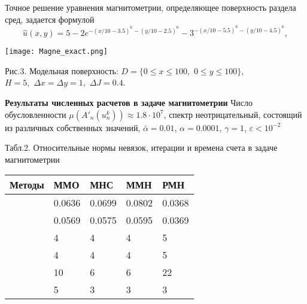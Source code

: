 \documentclass[10pt,pdf, mathserif, hyperref={unicode}]{beamer}
\begin{document}
\begin{frame}
	Точное решение уравнения магнитометрии, определяющее поверхность раздела сред, задается формулой %
	\begin{equation*}
	\hat{u}(x,y)=5-2e^{-(x/10-3.5)^6-(y/10-2.5)^6}-3^{-(x/10-5.5)^6-(y/10-4.5)^6},
	\end{equation*}
	\begin{center}
		\texttt{[image: Magne\_exact.png]}            %
	\end{center}
	
	\begin{center}
		Рис.3. Модельная поверхность: $D=\{0\le x\le 100, \,\,0\le y\le 100\}$, \\ $  H=5,\,\,\Delta x=\Delta y=1,\,\,\Delta J=0.4$.
	\end{center}
\end{frame}
\begin{frame}{\small\textbf{Результаты численных расчетов в задаче магнитометрии}}
	Число обусловленности $\mu(A'_n(u_n^k))\approx 1.8\cdot 10^7$, спектр неотрицательный, состоящий из различных собственных значений, $\bar\alpha=0.01$, $\alpha = 0.0001$, $\gamma=1$, $\varepsilon < 10^{-2}$
	
	\begin{table}
		\centering
		{\scriptsize Табл.2. Относительные нормы невязок, итерации и времена счета в задаче магнитометрии}
		
		\smallskip
		\begin{tabular}{|p{}|p{}|p{}|p{}|p{}|}
			\hline
			\rule{0cm}{0.5cm}
			Методы & ММО & МНС & ММН & РМН \\ \hline
			\rule{0cm}{0.5cm}
			\multirow{$\Delta$} & 0.0636 & 0.0699 & 0.0802 & 0.0368	 \\ \cline{2-5} 
			\rule{0cm}{0.5cm}
			&  0.0569   & 0.0575    &  0.0595   &  0.0369   \\ \hline
			\rule{0cm}{0.5cm}
			\multirow{$N$} & 4  &  4   &   4  &  5    \\ \cline{2-5}
			\rule{0cm}{0.5cm}
			&  4   &   4  &  4   &  5   \\ \hline
			\rule{0cm}{0.5cm}
			\multirow{$T$ (сек)}    &  10   &  6   &  6  & 22    \\ \cline{2-5}
			\rule{0cm}{0.5cm}
			& 5    & 3    &  3   &   3  \\ \hline
		\end{tabular}
	\end{table}
\end{frame}
\end{document}
